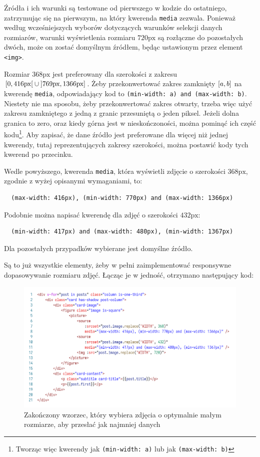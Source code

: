 \documentclass[licencjacka]{pracadypl}
\newcommand{\selfnote}[1]{\colorbox{pink}{#1}}
\begin{document}
Źródła i ich warunki są testowane od pierwszego w kodzie do ostatniego, zatrzymując się na pierwszym, na który kwerenda \texttt{media} zezwala.
Ponieważ według wcześniejszych wyborów dotyczących warunków selekcji danych rozmiarów, warunki wyświetlenia rozmiaru $720\text{px}$ są rozłączne do pozostałych dwóch, może on zostać domyślnym źródłem, będąc ustawionym przez element \texttt{<img>}.  


Rozmiar $368\text{px}$ jest preferowany dla szerokości z zakresu $\rinterval{0}{416\text{px}} \cup \linterval{769\text{px}}{1366\text{px}}$. Żeby przekonwertować zakres zamknięty $\interval{a}{b}$ na kwerendę \texttt{media}, odpowiadający kod to \texttt{(min-width: a) and (max-width: b)}. Niestety nie ma sposobu, żeby przekonwertować zakres otwarty, trzeba więc użyć zakresu zamkniętego z jedną z granic przesuniętą o jeden piksel. Jeżeli dolna granica to zero, oraz kiedy górna jest w nieskończoności, można pominąć ich część kodu\footnote{Tworząc więc kwerendy jak \texttt{(min-width: a)} lub jak \texttt{(max-width: b)}}. Aby zapisać, że dane źródło jest preferowane dla więcej niż jednej kwerendy, tutaj reprezentujących zakresy szerokości, można postawić kody tych kwerend po przecinku.

Wedle powyższego, kwerenda \texttt{media}, która wyświetli zdjęcie o szerokości $368\text{px}$, zgodnie z wyżej opisanymi wymaganiami, to:
\begin{verbatim}
  (max-width: 416px), (min-width: 770px) and (max-width: 1366px)
\end{verbatim}
Podobnie można napisać kwerendę dla zdjęć o szerokości $432\text{px}$:
\begin{verbatim}
  (min-width: 417px) and (max-width: 480px), (min-width: 1367px)
\end{verbatim}
Dla pozostałych przypadków wybierane jest domyślne źródło. 

Są to już wszystkie elementy, żeby w pełni zaimplementować responsywne dopasowywanie rozmiaru zdjęć. Łącząc je w jedność, otrzymano następujący kod:

\begin{figure}[H]
  \includegraphics[width=\linewidth]{images/code-vue-image-card-done.png}
  \caption{Zakończony wzorzec, który wybiera zdjęcia o optymalnie małym rozmiarze, aby przesłać jak najmniej danych}
  \label{fig:code-vue-template-articles-done}
\end{figure}
\end{document}
